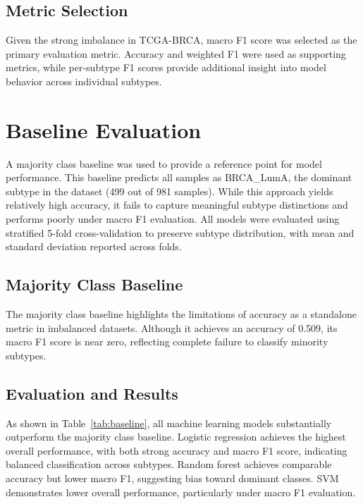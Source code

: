 \documentclass[10pt,twocolumn,letterpaper]{article}
\begin{document}
\subsection{Metric Selection}

Given the strong imbalance in TCGA-BRCA, macro F1 score was selected as the primary evaluation metric. Accuracy and weighted F1 were used as supporting metrics, while per-subtype F1 scores provide additional insight into model behavior across individual subtypes.

\FloatBarrier
\section{Baseline Evaluation}

A majority class baseline was used to provide a reference point for model performance. This baseline predicts all samples as BRCA\_LumA, the dominant subtype in the dataset (499 out of 981 samples). While this approach yields relatively high accuracy, it fails to capture meaningful subtype distinctions and performs poorly under macro F1 evaluation. All models were evaluated using stratified 5-fold cross-validation to preserve subtype distribution, with mean and standard deviation reported across folds.

\subsection{Majority Class Baseline}

The majority class baseline highlights the limitations of accuracy as a standalone metric in imbalanced datasets. Although it achieves an accuracy of 0.509, its macro F1 score is near zero, reflecting complete failure to classify minority subtypes.

\subsection{Evaluation and Results}

As shown in Table~\ref{tab:baseline}, all machine learning models substantially outperform the majority class baseline. Logistic regression achieves the highest overall performance, with both strong accuracy and macro F1 score, indicating balanced classification across subtypes. Random forest achieves comparable accuracy but lower macro F1, suggesting bias toward dominant classes. SVM demonstrates lower overall performance, particularly under macro F1 evaluation.
\end{document}
